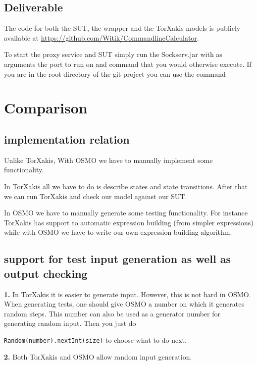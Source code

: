 \documentclass[11pt,a4paper]{article}
\begin{document}
\subsection{Deliverable}

The code for both the SUT, the wrapper and the TorXakis models is
publicly available at
\url{https://github.com/Witik/CommandlineCalculator}.

To start the proxy service and SUT simply run the Sockserv.jar with as
arguments the port to run on and command that you would otherwise
execute. If you are in the root directory of the git project you can
use the command

\section{Comparison}
\subsection{implementation relation}
Unlike TorXakis, With OSMO we have to manually implement some functionality.

In TorXakis all we have to do is describe states and state
transitions. After that we can run TorXakis and check our model
against our SUT.

In OSMO we have to manually generate some testing functionality. For
instance TorXakis has support to automatic expression building (from
simpler expressions) while with OSMO we have to write our own
expression building algorithm.

\subsection{support for test input generation as well as output checking}
\textbf{1.}
In TorXakis it is easier to generate input. However, this is not hard
in OSMO. When generating tests, one should give OSMO a number on which
it generates random steps. This number can also be used as a generator
number for generating random input. Then you just do

\verb|Random(number).nextInt(size)| to choose what to do next.

\textbf{2.}
Both TorXakis and OSMO allow random input generation.
\end{document}
